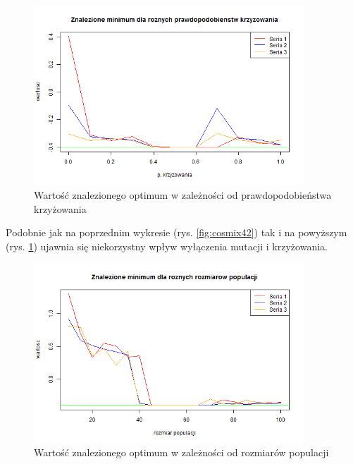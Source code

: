 \documentclass[11pt, a4paper]{article}
\newcommand{\fbi}{\leavevmode{\parindent=1em\indent}}
\begin{document}
\begin{figure}[H]
	\begin{center}
		\includegraphics[width=0.9\textwidth]{./assets/CosMix43.png}
		\caption{Wartość znalezionego optimum w zależności od prawdopodobieństwa krzyżowania}
		\label{fig:cosmix43}
	\end{center}
\end{figure}

\fbi
Podobnie jak na poprzednim wykresie (rys. \ref{fig:cosmix42}) tak i na powyższym (rys. \ref{fig:cosmix43}) ujawnia się niekorzystny wpływ wyłączenia mutacji i krzyżowania.


\begin{figure}[H]
	\begin{center}
		\includegraphics[width=0.9\textwidth]{./assets/CosMix44.png} %
		\caption{Wartość znalezionego optimum w zależności od rozmiarów populacji}
		\label{fig:cosmix44}
	\end{center}
\end{figure}
\end{document}
